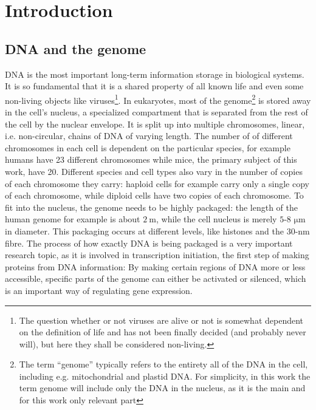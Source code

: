 \documentclass[a4paper,11pt,oneside,final,english,toc=bib]{scrbook}
\begin{document}

\tableofcontents
\clearpage

\mainmatter
\sloppy

% 
\chapter{Introduction} %
\label{cha:introduction}

\section{DNA and the genome} %
\label{sec:dna_and_genome}

DNA is the most important long-term information storage in biological systems. It is so fundamental that it is a shared property of all known life and even some non-living objects like viruses\footnote{The question whether or not viruses are alive or not is somewhat dependent on the definition of life and has not been finally decided (and probably never will), but here they shall be considered non-living.}. In eukaryotes, most of the genome\footnote{The term \enquote{genome} typically refers to the entirety all of the DNA in the cell, including e.g. mitochondrial and plastid DNA. For simplicity, in this work the term genome will include only the DNA in the nucleus, as it is the main and for this work only relevant part} is stored away in the cell's nucleus, a specialized compartment that is separated from the rest of the cell by the nuclear envelope. It is split up into multiple chromosomes, linear, i.e. non-circular, chains of DNA of varying length. The number of of different chromosomes in each cell is dependent on the particular species, for example humans have 23 different chromosomes while mice, the primary subject of this work, have 20. Different species and cell types also vary in the number of copies of each chromosome they carry: haploid cells for example carry only a single copy of each chromosome, while diploid cells have two copies of each chromosome. To fit into the nucleus, the genome needs to be highly packaged: the length of the human genome for example is about \(\SI{2}{\metre}\), while the cell nucleus is merely \(5\)-\(8\) \(\si{\micro\metre}\) in diameter. This packaging occurs at different levels, like histones and the 30-nm fibre. The process of how exactly DNA is being packaged is a very important research topic, as it is involved in transcription initiation, the first step of making proteins from DNA information: By making certain regions of DNA more or less accessible, specific parts of the genome can either be activated or silenced, which is an important way of regulating gene expression. \cite{uzman_essential_2010}
\end{document}
